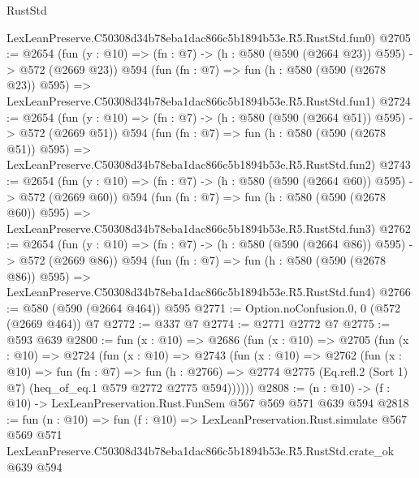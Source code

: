 \begin{lexlean}{RustStd}
\begin{coremodule}
    LexLeanPreserve.C50308d34b78eba1dac866c5b1894b53e.R5.RustStd.fun0)
@2705 := @2654
    (fun (y : @10) => (fn : @7) -> (h : @580 (@590 (@2664 @23)) @595) -> @572 (@2669 @23))
    @594
    (fun (fn : @7) =>
    fun (h : @580 (@590 (@2678 @23)) @595) =>
    LexLeanPreserve.C50308d34b78eba1dac866c5b1894b53e.R5.RustStd.fun1)
@2724 := @2654
    (fun (y : @10) => (fn : @7) -> (h : @580 (@590 (@2664 @51)) @595) -> @572 (@2669 @51))
    @594
    (fun (fn : @7) =>
    fun (h : @580 (@590 (@2678 @51)) @595) =>
    LexLeanPreserve.C50308d34b78eba1dac866c5b1894b53e.R5.RustStd.fun2)
@2743 := @2654
    (fun (y : @10) => (fn : @7) -> (h : @580 (@590 (@2664 @60)) @595) -> @572 (@2669 @60))
    @594
    (fun (fn : @7) =>
    fun (h : @580 (@590 (@2678 @60)) @595) =>
    LexLeanPreserve.C50308d34b78eba1dac866c5b1894b53e.R5.RustStd.fun3)
@2762 := @2654
    (fun (y : @10) => (fn : @7) -> (h : @580 (@590 (@2664 @86)) @595) -> @572 (@2669 @86))
    @594
    (fun (fn : @7) =>
    fun (h : @580 (@590 (@2678 @86)) @595) =>
    LexLeanPreserve.C50308d34b78eba1dac866c5b1894b53e.R5.RustStd.fun4)
@2766 := @580 (@590 (@2664 @464)) @595
@2771 := Option.noConfusion.{0, 0} (@572 (@2669 @464)) @7
@2772 := @337 @7
@2774 := @2771 @2772 @7
@2775 := @593 @639
@2800 := fun (x : @10) =>
  @2686
    (fun (x : @10) =>
    @2705
      (fun (x : @10) =>
      @2724
        (fun (x : @10) =>
        @2743
          (fun (x : @10) =>
          @2762
            (fun (x : @10) =>
            fun (fn : @7) =>
            fun (h : @2766) =>
            @2774 @2775 (Eq.refl.{2} (Sort 1) @7) (heq_of_eq.{1} @579 @2772 @2775 @594))))))
@2808 := (n : @10) -> (f : @10) -> LexLeanPreservation.Rust.FunSem @567 @569 @571 @639 @594
@2818 := fun (n : @10) =>
  fun (f : @10) =>
  LexLeanPreservation.Rust.simulate
    @567
    @569
    @571
    LexLeanPreserve.C50308d34b78eba1dac866c5b1894b53e.R5.RustStd.crate_ok
    @639
    @594
\end{coremodule}
\end{lexlean}
